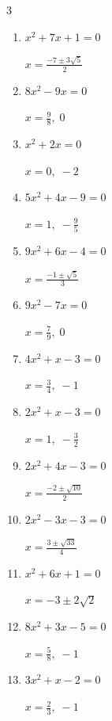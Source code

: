\begin{multicols}{3}
\begin{enumerate}
  \item $x^{2}+7x+1=0$

        $\displaystyle x=\frac{-7\pm 3\sqrt{5}}{2}$

  \item $8x^{2}-9x=0$

        $\displaystyle x=\frac{9}{8}, \; 0$

  \item $x^{2}+2x=0$

        $\displaystyle x=0, \; -2$

  \item $5x^{2}+4x-9=0$

        $\displaystyle x=1, \; -\frac{9}{5}$

  \item $9x^{2}+6x-4=0$

        $\displaystyle x=\frac{-1\pm \sqrt{5}}{3}$

  \item $9x^{2}-7x=0$

        $\displaystyle x=\frac{7}{9}, \; 0$

\columnbreak %

\resetques

  \item $4x^{2}+x-3=0$

        $\displaystyle x=\frac{3}{4}, \; -1$

  \item $2x^{2}+x-3=0$

        $\displaystyle x=1, \; -\frac{3}{2}$

  \item $2x^{2}+4x-3=0$

        $\displaystyle x=\frac{-2\pm \sqrt{10}}{2}$

  \item $2x^{2}-3x-3=0$

        $\displaystyle x=\frac{3\pm \sqrt{33}}{4}$

  \item $x^{2}+6x+1=0$

        $\displaystyle x=-3\pm 2\sqrt{2}$

  \item $8x^{2}+3x-5=0$

        $\displaystyle x=\frac{5}{8}, \; -1$

  \item $3x^{2}+x-2=0$

        $\displaystyle x=\frac{2}{3}, \; -1$

\columnbreak %


\end{enumerate}
\end{multicols}
